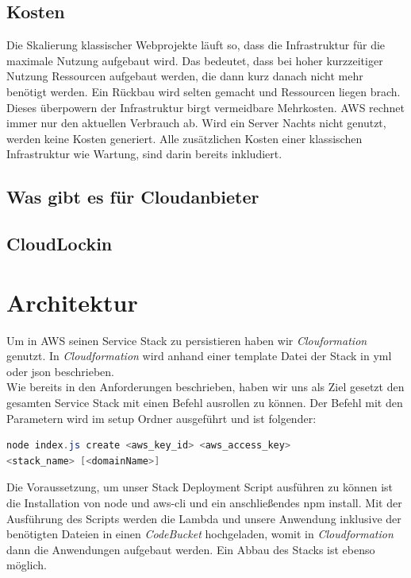 \documentclass[a4paper, 12pt]{scrreprt}
\renewcommand\_{\textunderscore\allowbreak}
\begin{document}
\section{Kosten}
Die Skalierung klassischer Webprojekte läuft so, dass die Infrastruktur für die maximale Nutzung aufgebaut wird. Das bedeutet, dass bei hoher kurzzeitiger Nutzung Ressourcen aufgebaut werden, die dann kurz danach nicht mehr benötigt werden. Ein Rückbau wird selten gemacht und Ressourcen liegen brach.\\
Dieses überpowern der Infrastruktur birgt vermeidbare Mehrkosten. AWS rechnet immer nur den aktuellen Verbrauch ab. Wird ein Server Nachts nicht genutzt, werden keine Kosten generiert. Alle zusätzlichen Kosten einer klassischen Infrastruktur wie Wartung, sind darin bereits inkludiert.
\section{Was gibt es für Cloudanbieter}

\section{CloudLockin}

\chapter{Architektur}
Um in AWS seinen Service Stack zu persistieren haben wir \textit{Clouformation} genutzt. In \textit{Cloudformation} wird anhand einer template Datei der Stack in yml oder json beschrieben. \\
Wie bereits in den Anforderungen beschrieben, haben wir uns als Ziel gesetzt den gesamten Service Stack mit einen Befehl ausrollen zu können. Der Befehl mit den Parametern wird im setup Ordner ausgeführt und ist folgender:

\begin{lstlisting}[xleftmargin=\parindent,frame=L,mathescape=true, basicstyle=\small, language=Java, lineskip={1.0pt}]
node index.js create <aws_key_id> <aws_access_key> 
<stack_name> [<domainName>]
\end{lstlisting}

Die Voraussetzung, um unser Stack Deployment Script ausführen zu können ist die Installation von node und aws-cli und ein anschließendes npm install.
Mit der Ausführung des Scripts werden die Lambda und unsere Anwendung inklusive der benötigten Dateien in einen \textit{CodeBucket} hochgeladen, womit in \textit{Cloudformation} dann die Anwendungen aufgebaut werden. Ein Abbau des Stacks ist ebenso möglich.
\end{document}
